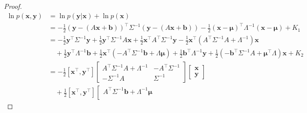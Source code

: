 \begin{proof}

    \begin{align}
        \ln p(\mathbf{x},\mathbf{y})&=\ln p(\mathbf{y}|\mathbf{x})+\ln p(\mathbf{x})\nonumber\\
                                    &=-\frac{1}{2}\left(\mathbf{y}-\left(A\mathbf{x}+\mathbf{b}\right)\right)^\intercal\Sigma^{-1}\left(\mathbf{y}-\left(A\mathbf{x}+\mathbf{b}\right)\right)-\frac{1}{2}\left(\mathbf{x}-\boldsymbol{\mu}\right)^\intercal\Lambda^{-1}\left(\mathbf{x}-\boldsymbol{\mu}\right)+K_1\nonumber\\
                                    &=-\frac{1}{2}\mathbf{y}^\intercal\Sigma^{-1}\mathbf{y}+\frac{1}{2}\mathbf{y}^\intercal\Sigma^{-1}A\mathbf{x}+\frac{1}{2}\mathbf{x}^\intercal
                                    A^\intercal\Sigma^{-1}\mathbf{y}-\frac{1}{2}\mathbf{x}^\intercal\left(A^\intercal\Sigma^{-1}A+\Lambda^{-1}\right)\mathbf{x}\nonumber\\
                                    &\quad+\frac{1}{2}\mathbf{y}^\intercal\Lambda^{-1}\mathbf{b}+\frac{1}{2}\mathbf{x}^\intercal(-A^\intercal\Sigma^{-1}\mathbf{b}+\Lambda\boldsymbol{\mu})+\frac{1}{2}\mathbf{b}^\intercal\Lambda^{-1}\mathbf{y}+\frac{1}{2}(-\mathbf{b}^\intercal\Sigma^{-1}A+\boldsymbol{\mu}^\intercal\Lambda)\mathbf{x}+K_2\nonumber\\
                                    &=-\frac{1}{2}[\mathbf{x}^\intercal,\mathbf{y}^\intercal]
                                    \left[\begin{array}{cc}
                                        A^\intercal\Sigma^{-1}A+\Lambda^{-1}&-A^\intercal\Sigma^{-1}\nonumber\\
                                        -\Sigma^{-1}A&\Sigma^{-1}
                                    \end{array}\right]\left[\begin{array}{c}
                                                                \mathbf{x}\nonumber\\
                                                                \mathbf{y}
                                                            \end{array}\right]\nonumber\\
                                    &\quad+\frac{1}{2}[\mathbf{x}^\intercal,\mathbf{y}^\intercal]
                                    \left[\begin{array}{c}
                                        A^\intercal\Sigma^{-1}\mathbf{b}+\Lambda^{-1}\boldsymbol{\mu}\\

\end{array}
\end{align}
\end{proof}

